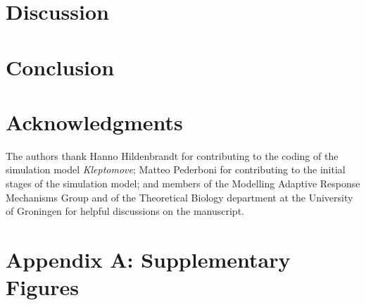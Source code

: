 \documentclass[11pt]{article}
\begin{document}

\section*{Discussion}

\section*{Conclusion}



\section*{Acknowledgments}

The authors thank Hanno Hildenbrandt for contributing to the coding of the simulation model \textit{Kleptomove}; 
Matteo Pederboni for contributing to the initial stages of the simulation model; 
and members of the Modelling Adaptive Response Mechanisms Group and of the Theoretical Biology department at the University of Groningen for helpful discussions on the manuscript.



\newpage{}

\section*{Appendix A: Supplementary Figures}
\end{document}
